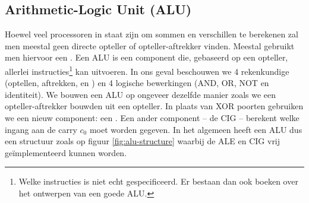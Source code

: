\subsection{Arithmetic-Logic Unit (ALU)}
Hoewel veel processoren in staat zijn om sommen en verschillen te berekenen zal men meestal geen directe opteller of opteller-aftrekker vinden. Meestal gebruikt men hiervoor een . Een ALU is een component die, gebaseerd op een opteller, allerlei instructies\footnote{Welke instructies is niet echt gespecificeerd. Er bestaan dan ook boeken over het ontwerpen van een goede ALU.} kan uitvoeren. In ons geval beschouwen we 4 rekenkundige (optellen, aftrekken,  en ) en 4 logische bewerkingen (AND, OR, NOT en identiteit). We bouwen een ALU op ongeveer dezelfde manier zoals we een opteller-aftrekker bouwden uit een opteller. In plaats van XOR poorten gebruiken we een nieuw component: een . Een ander component -- de CIG -- berekent welke ingang aan de carry $c_0$ moet worden gegeven. In het algemeen heeft een ALU dus een structuur zoals op figuur \ref{fig:alu-structure} waarbij de ALE en CIG vrij ge\"implementeerd kunnen worden.
